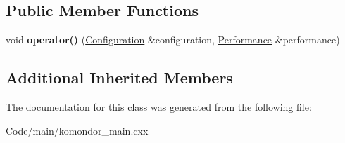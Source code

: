 \subsection*{Public Member Functions}
\begin{DoxyCompactItemize}
\item 
\mbox{\label{classcompcxx__Node__23_1_1my__Node__outportAnswerToAgent__f__t_a3d936bdbfe56a21f123aba8288b0e5e5}} 
void {\bfseries operator()} (\hyperlink{structConfiguration}{Configuration} \&configuration, \hyperlink{structPerformance}{Performance} \&performance)
\end{DoxyCompactItemize}
\subsection*{Additional Inherited Members}


The documentation for this class was generated from the following file\+:\begin{DoxyCompactItemize}
\item 
Code/main/komondor\+\_\+main.\+cxx\end{DoxyCompactItemize}
